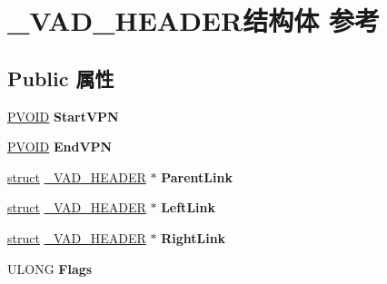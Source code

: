 \hypertarget{struct___v_a_d___h_e_a_d_e_r}{}\section{\+\_\+\+V\+A\+D\+\_\+\+H\+E\+A\+D\+E\+R结构体 参考}
\label{struct___v_a_d___h_e_a_d_e_r}
\subsection*{Public 属性}
\begin{DoxyCompactItemize}
\item 
\mbox{\label{struct___v_a_d___h_e_a_d_e_r_ae49ab5da695e156f3777362ad0d698de}} 
\hyperlink{interfacevoid}{P\+V\+O\+ID} {\bfseries Start\+V\+PN}
\item 
\mbox{\label{struct___v_a_d___h_e_a_d_e_r_ab5422bb85a0379df4f40027c9b0eae52}} 
\hyperlink{interfacevoid}{P\+V\+O\+ID} {\bfseries End\+V\+PN}
\item 
\mbox{\label{struct___v_a_d___h_e_a_d_e_r_aad79cf4399316a4c9b4849b00b90e198}} 
\hyperlink{interfacestruct}{struct} \hyperlink{struct___v_a_d___h_e_a_d_e_r}{\+\_\+\+V\+A\+D\+\_\+\+H\+E\+A\+D\+ER} $\ast$ {\bfseries Parent\+Link}
\item 
\mbox{\label{struct___v_a_d___h_e_a_d_e_r_a6c4a64114dfebd730c8c475891bd7360}} 
\hyperlink{interfacestruct}{struct} \hyperlink{struct___v_a_d___h_e_a_d_e_r}{\+\_\+\+V\+A\+D\+\_\+\+H\+E\+A\+D\+ER} $\ast$ {\bfseries Left\+Link}
\item 
\mbox{\label{struct___v_a_d___h_e_a_d_e_r_a46bacc137ce5351474858f799183c0b4}} 
\hyperlink{interfacestruct}{struct} \hyperlink{struct___v_a_d___h_e_a_d_e_r}{\+\_\+\+V\+A\+D\+\_\+\+H\+E\+A\+D\+ER} $\ast$ {\bfseries Right\+Link}
\item 
\mbox{\label{struct___v_a_d___h_e_a_d_e_r_ae9b78c6d9f63b8eb1864588c037b41f2}} 
U\+L\+O\+NG {\bfseries Flags}
\item 
\mbox{\label{struct___v_a_d___h_e_a_d_e_r_a2ec5331474e51895530def26d6602dab}} 

\end{DoxyCompactItemize}
